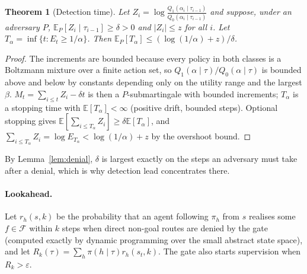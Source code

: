 \documentclass[11pt]{article}
\newtheorem{theorem}{Theorem}
\theoremstyle{definition}
\theoremstyle{remark}
\newcommand{\F}{\mathcal{F}}
\newcommand{\act}{\alpha}
\newcommand{\traj}{\tau}
\newcommand{\Qb}{Q_0}
\newcommand{\Qa}{Q_1}
\newcommand{\E}{\mathbb{E}}
\begin{document}
\begin{theorem}[Detection time]
\label{thm:time}
Let $Z_i=\log\frac{\Qa(\act_i\mid\traj_{i-1})}{\Qb(\act_i\mid\traj_{i-1})}$ and suppose, under an adversary $P$, $\E_P[Z_i\mid\traj_{i-1}]\ge\delta>0$ and $|Z_i|\le z$ for all $i$. Let $T_\alpha=\inf\{t:E_t\ge1/\alpha\}$. Then $\E_P[T_\alpha]\le(\log(1/\alpha)+z)/\delta$.
\end{theorem}
\begin{proof}
The increments are bounded because every policy in both classes is a Boltzmann mixture over a finite action set, so $\Qa(\act\mid\traj)/\Qb(\act\mid\traj)$ is bounded above and below by constants depending only on the utility range and the largest $\beta$. $M_t=\sum_{i\le t}Z_i-\delta t$ is then a $P$-submartingale with bounded increments; $T_\alpha$ is a stopping time with $\E[T_\alpha]<\infty$ (positive drift, bounded steps). Optional stopping gives $\E[\sum_{i\le T_\alpha}Z_i]\ge\delta\E[T_\alpha]$, and $\sum_{i\le T_\alpha}Z_i=\log E_{T_\alpha}<\log(1/\alpha)+z$ by the overshoot bound.
\end{proof}

By Lemma~\ref{lem:denial}, $\delta$ is largest exactly on the steps an adversary must take after a denial, which is why detection lead concentrates there.

\paragraph{Lookahead.} Let $r_h(s,k)$ be the probability that an agent following $\pi_h$ from $s$ realises some $f\in\F$ within $k$ steps when direct non-goal routes are denied by the gate (computed exactly by dynamic programming over the small abstract state space), and let $R_k(\traj)=\sum_h\pi(h\mid\traj)r_h(s_t,k)$. The gate also starts supervision when $R_k>\varepsilon$.
\end{document}

